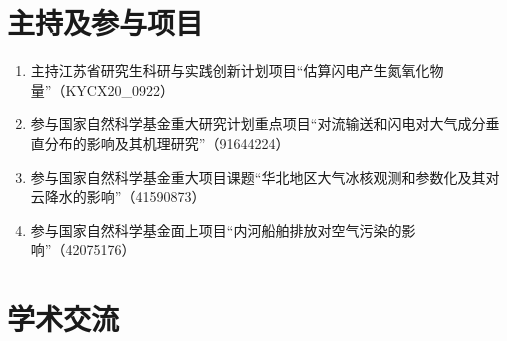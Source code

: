 \clearpage

\specialsectioning
\section{主持及参与项目}

\begin{enumerate}[label={（\arabic*）}, leftmargin=20pt, widest=0, itemindent=*, topsep=0pt, partopsep=0pt, parsep=0pt]

\item 主持江苏省研究生科研与实践创新计划项目“估算闪电产生氮氧化物量”（KYCX20\_0922） %

\item 参与国家自然科学基金重大研究计划重点项目“对流输送和闪电对大气成分垂直分布的影响及其机理研究”（91644224） %

\item 参与国家自然科学基金重大项目课题“华北地区大气冰核观测和参数化及其对云降水的影响”（41590873）%

\item 参与国家自然科学基金面上项目“内河船舶排放对空气污染的影响”（42075176） %

\end{enumerate}

\specialsectioning
\section{学术交流}

